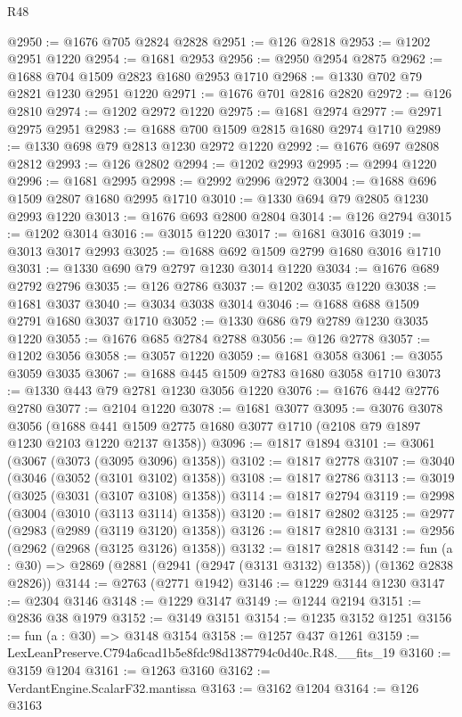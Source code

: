 \begin{lexlean}{R48}
\begin{coremodule}
@2950 := @1676 @705 @2824 @2828
@2951 := @126 @2818
@2953 := @1202 @2951 @1220
@2954 := @1681 @2953
@2956 := @2950 @2954 @2875
@2962 := @1688 @704 @1509 @2823 @1680 @2953 @1710
@2968 := @1330 @702 @79 @2821 @1230 @2951 @1220
@2971 := @1676 @701 @2816 @2820
@2972 := @126 @2810
@2974 := @1202 @2972 @1220
@2975 := @1681 @2974
@2977 := @2971 @2975 @2951
@2983 := @1688 @700 @1509 @2815 @1680 @2974 @1710
@2989 := @1330 @698 @79 @2813 @1230 @2972 @1220
@2992 := @1676 @697 @2808 @2812
@2993 := @126 @2802
@2994 := @1202 @2993
@2995 := @2994 @1220
@2996 := @1681 @2995
@2998 := @2992 @2996 @2972
@3004 := @1688 @696 @1509 @2807 @1680 @2995 @1710
@3010 := @1330 @694 @79 @2805 @1230 @2993 @1220
@3013 := @1676 @693 @2800 @2804
@3014 := @126 @2794
@3015 := @1202 @3014
@3016 := @3015 @1220
@3017 := @1681 @3016
@3019 := @3013 @3017 @2993
@3025 := @1688 @692 @1509 @2799 @1680 @3016 @1710
@3031 := @1330 @690 @79 @2797 @1230 @3014 @1220
@3034 := @1676 @689 @2792 @2796
@3035 := @126 @2786
@3037 := @1202 @3035 @1220
@3038 := @1681 @3037
@3040 := @3034 @3038 @3014
@3046 := @1688 @688 @1509 @2791 @1680 @3037 @1710
@3052 := @1330 @686 @79 @2789 @1230 @3035 @1220
@3055 := @1676 @685 @2784 @2788
@3056 := @126 @2778
@3057 := @1202 @3056
@3058 := @3057 @1220
@3059 := @1681 @3058
@3061 := @3055 @3059 @3035
@3067 := @1688 @445 @1509 @2783 @1680 @3058 @1710
@3073 := @1330 @443 @79 @2781 @1230 @3056 @1220
@3076 := @1676 @442 @2776 @2780
@3077 := @2104 @1220
@3078 := @1681 @3077
@3095 := @3076
    @3078
    @3056
    (@1688 @441 @1509 @2775 @1680 @3077 @1710 (@2108 @79 @1897 @1230 @2103 @1220 @2137 @1358))
@3096 := @1817 @1894
@3101 := @3061 (@3067 (@3073 (@3095 @3096) @1358))
@3102 := @1817 @2778
@3107 := @3040 (@3046 (@3052 (@3101 @3102) @1358))
@3108 := @1817 @2786
@3113 := @3019 (@3025 (@3031 (@3107 @3108) @1358))
@3114 := @1817 @2794
@3119 := @2998 (@3004 (@3010 (@3113 @3114) @1358))
@3120 := @1817 @2802
@3125 := @2977 (@2983 (@2989 (@3119 @3120) @1358))
@3126 := @1817 @2810
@3131 := @2956 (@2962 (@2968 (@3125 @3126) @1358))
@3132 := @1817 @2818
@3142 := fun (a : @30) => @2869 (@2881 (@2941 (@2947 (@3131 @3132) @1358)) (@1362 @2838 @2826))
@3144 := @2763 (@2771 @1942)
@3146 := @1229 @3144 @1230
@3147 := @2304 @3146
@3148 := @1229 @3147
@3149 := @1244 @2194
@3151 := @2836 @38 @1979
@3152 := @3149 @3151
@3154 := @1235 @3152 @1251
@3156 := fun (a : @30) => @3148 @3154
@3158 := @1257 @437 @1261
@3159 := LexLeanPreserve.C794a6cad1b5e8fdc98d1387794c0d40c.R48.__fits_19
@3160 := @3159 @1204
@3161 := @1263 @3160
@3162 := VerdantEngine.ScalarF32.mantissa
@3163 := @3162 @1204
@3164 := @126 @3163

\end{coremodule}
\end{lexlean}
